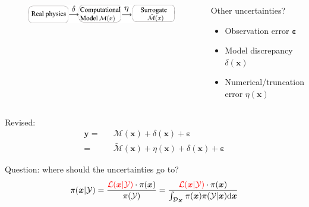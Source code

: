 \begin{frame}
\begin{columns}
      \begin{figure} 
 \includegraphics[scale=0.6]{figures/figure-TrunctionerrorandModeldiscrepancy.pdf}
\end{figure}
    \begin{block}{Other uncertainties?}
    \begin{itemize}
    \item Observation error $\boldsymbol{\varepsilon}$
    \item Model discrepancy $\delta(\boldsymbol{x})$
    \item Numerical/truncation error $\eta({\boldsymbol{x}})$
    \end{itemize}       
    \end{block} 
\end{columns}

\begin{block}{Revised:}
\begin{equation*}
\label{eq: COV_uncertainties}
\begin{aligned}
     \boldsymbol{y}
= &&
{\mathcal{M}}(\boldsymbol{x}) + {\delta(\boldsymbol{x})}
+ \boldsymbol{\varepsilon} \\
= &&
\tilde{\mathcal{M}}(\boldsymbol{x})
+ \eta({\boldsymbol{x}})
+ \delta(\boldsymbol{x})
+ \boldsymbol{\varepsilon}
\end{aligned}
\end{equation*}
\end{block}

\begin{alert}{Question: where should the uncertainties go to?}
\begin{equation*}               
\pi(\boldsymbol{x}|\mathcal{Y}) = 
\frac{{\textcolor{red}{\mathcal{L}(\boldsymbol{x}|\mathcal{Y})} \cdot \pi(\boldsymbol{x})}}{{\pi(\mathcal{Y})}}
= \frac{{\textcolor{red}{\mathcal{L}(\boldsymbol{x}|\mathcal{Y})} \cdot \pi(\boldsymbol{x})}}
{\int_{\mathcal{D}_{\boldsymbol{X}}} 
    \pi(\boldsymbol{x}) \pi(\mathcal{Y}|\boldsymbol{x}) {\rm{d}} \boldsymbol{x}}
\end{equation*}    
\end{alert}  
\end{frame}
